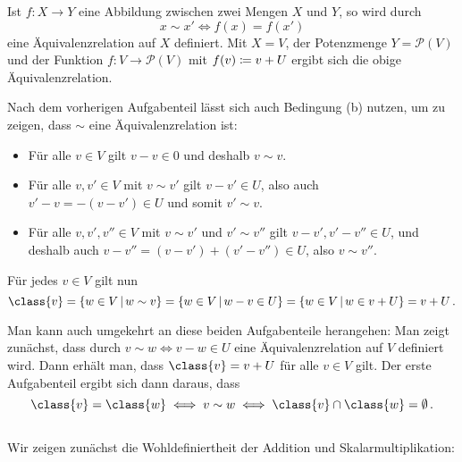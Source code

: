 \begin{remark}
  Ist $f \colon X \to Y$ eine Abbildung zwischen zwei Mengen $X$ und $Y$, so wird durch
  \[
          x \sim x'
    \iff  f(x) = f(x')
  \]
  eine Äquivalenzrelation auf $X$ definiert.
  Mit $X = V$, der Potenzmenge $Y = \mathcal{P}(V)$ und der Funktion $f \colon V \to \mathcal{P}(V)$ mit $f(v) \coloneqq v + U$ ergibt sich die obige Äquivalenzrelation.
\end{remark}

Nach dem vorherigen Aufgabenteil lässt sich auch Bedingung (b) nutzen, um zu zeigen, dass $\sim$ eine Äquivalenzrelation ist:

\begin{itemize}
  \item
    Für alle $v \in V$ gilt $v - v \in 0$ und deshalb $v \sim v$.
  \item
    Für alle $v, v' \in V$ mit $v \sim v'$ gilt $v - v' \in U$, also auch $v' - v = -(v - v') \in U$ und somit $v' \sim v$.
  \item
    Für alle $v, v', v'' \in V$ mit $v \sim v'$ und $v' \sim v''$ gilt $v - v', v' - v'' \in U$, und deshalb auch $v - v'' = (v - v') + (v' - v'') \in U$, also $v \sim v''$.
\end{itemize}

Für jedes $v \in V$ gilt nun
\[
    \class{v}
  = \{ w \in V \suchthat w \sim v \}
  = \{ w \in V \suchthat w - v \in U \}
  = \{ w \in V \suchthat w \in v + U \}
  = v + U \,.
\]

\begin{remark}
  Man kann auch umgekehrt an diese beiden Aufgabenteile herangehen:
  Man zeigt zunächst, dass durch $v \sim w \iff v - w \in U$ eine Äquivalenzrelation auf $V$ definiert wird.
  Dann erhält man, dass $\class{v} = v + U$ für alle $v \in V$ gilt.
  Der erste Aufgabenteil ergibt sich dann daraus, dass
  \[
          \class{v} = \class{w}
    \iff  v \sim w
    \iff  \class{v} \cap \class{w} = \emptyset \,.
  \]
\end{remark}





\subsection{}

Wir zeigen zunächst die Wohldefiniertheit der Addition und Skalarmultiplikation:

